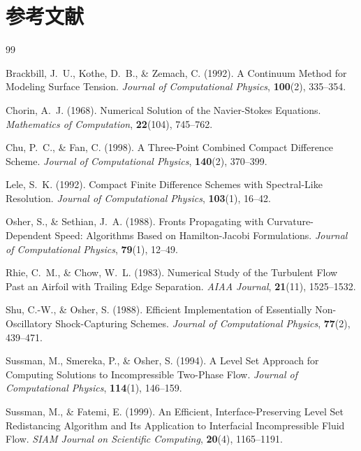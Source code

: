 \documentclass[12pt, a4paper, titlepage]{article}
\newcommand{\jp}[1]{{\normalfont\jpfont #1}}
\begin{document}
\section*{\jp{参考文献}}
\addcontentsline{toc}{section}{\jp{参考文献}}

\begin{thebibliography}{99}

Brackbill, J.~U., Kothe, D.~B., \& Zemach, C. (1992).
A Continuum Method for Modeling Surface Tension.
\textit{Journal of Computational Physics}, \textbf{100}(2), 335--354.

Chorin, A.~J. (1968).
Numerical Solution of the Navier-Stokes Equations.
\textit{Mathematics of Computation}, \textbf{22}(104), 745--762.

Chu, P.~C., \& Fan, C. (1998).
A Three-Point Combined Compact Difference Scheme.
\textit{Journal of Computational Physics}, \textbf{140}(2), 370--399.

Lele, S.~K. (1992).
Compact Finite Difference Schemes with Spectral-Like Resolution.
\textit{Journal of Computational Physics}, \textbf{103}(1), 16--42.

Osher, S., \& Sethian, J.~A. (1988).
Fronts Propagating with Curvature-Dependent Speed:
Algorithms Based on Hamilton-Jacobi Formulations.
\textit{Journal of Computational Physics}, \textbf{79}(1), 12--49.

Rhie, C.~M., \& Chow, W.~L. (1983).
Numerical Study of the Turbulent Flow Past an Airfoil with Trailing Edge Separation.
\textit{AIAA Journal}, \textbf{21}(11), 1525--1532.

Shu, C.-W., \& Osher, S. (1988).
Efficient Implementation of Essentially Non-Oscillatory Shock-Capturing Schemes.
\textit{Journal of Computational Physics}, \textbf{77}(2), 439--471.

Sussman, M., Smereka, P., \& Osher, S. (1994).
A Level Set Approach for Computing Solutions to Incompressible Two-Phase Flow.
\textit{Journal of Computational Physics}, \textbf{114}(1), 146--159.

Sussman, M., \& Fatemi, E. (1999).
An Efficient, Interface-Preserving Level Set Redistancing Algorithm and Its Application to Interfacial Incompressible Fluid Flow.
\textit{SIAM Journal on Scientific Computing}, \textbf{20}(4), 1165--1191.


\end{thebibliography}
\end{document}
